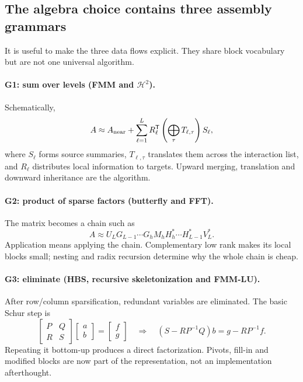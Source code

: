 \subsection{The algebra choice contains three assembly grammars}
\label{sec:grammars}
It is useful to make the three data flows explicit. They share block vocabulary but are not one universal algorithm.

\paragraph{G1: sum over levels (FMM and $\mathcal H^2$).}
Schematically,
\begin{equation}
 A\approx A_{\rm near}+\sum_{\ell=1}^{L}R_\ell^{\mathsf{T}}
 \left(\bigoplus_{\tau}T_{\ell,\tau}\right)S_\ell,
 \label{eq:g1}
\end{equation}
where $S_\ell$ forms source summaries, $T_{\ell,\tau}$ translates them across the interaction list, and $R_\ell$ distributes local information to targets. Upward merging, translation and downward inheritance are the algorithm.

\paragraph{G2: product of sparse factors (butterfly and FFT).}
The matrix becomes a chain such as
\begin{equation}
 A\approx U_LG_{L-1}\cdots G_hM_hH_h^*\cdots H_{L-1}^*V_L^*.
 \label{eq:g2}
\end{equation}
Application means applying the chain. Complementary low rank makes its local blocks small; nesting and radix recursion determine why the whole chain is cheap.

\paragraph{G3: eliminate (HBS, recursive skeletonization and FMM-LU).}
After row/column sparsification, redundant variables are eliminated. The basic Schur step is
\begin{equation}
 \begin{bmatrix}P&Q\\R&S\end{bmatrix}
 \begin{bmatrix}a\\b\end{bmatrix}=\begin{bmatrix}f\\g\end{bmatrix}
 \quad\Longrightarrow\quad
 (S-RP^{-1}Q)b=g-RP^{-1}f.
 \label{eq:schur}
\end{equation}
Repeating it bottom-up produces a direct factorization. Pivots, fill-in and modified blocks are now part of the representation, not an implementation afterthought.

